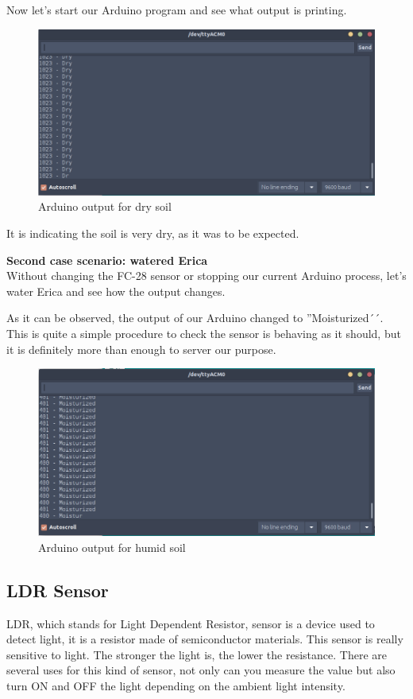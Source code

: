 Now let's start our Arduino program and see what output is printing.

\begin{figure}[H]
    \centering
    \includegraphics[width=1\textwidth]{fig/seco.png}
    \caption{Arduino output for dry soil}
    \label{fig:dry-soil}
\end{figure}

It is indicating the soil is very dry, as it was to be expected.

\textbf{Second case scenario: watered Erica} \\
Without changing the FC-28 sensor or stopping our current Arduino process, let's water Erica and see how the output changes.

As it can be observed, the output of our Arduino changed to ''Moisturized´´. This is quite a simple procedure to check the sensor is behaving as it should, but it is definitely more than enough to server our purpose.

\begin{figure}[H]
    \centering
    \includegraphics[width=1\textwidth]{fig/humedo.png}
    \caption{Arduino output for humid soil}
    \label{fig:humid-soil}
\end{figure}


\subsection{LDR Sensor}
LDR\cite{ldr}, which stands for Light Dependent Resistor, sensor is a device used to detect light, it is a resistor made of semiconductor materials. This sensor is really sensitive to light. The stronger the light is, the lower the resistance. There are several uses for this kind of sensor, not only can you measure the value but also turn ON and OFF the light depending on the ambient light intensity.

